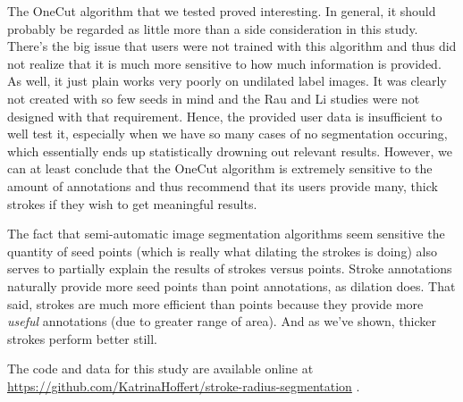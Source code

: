 \documentclass[12pt,a4paper,notitlepage]{article}
\begin{document}
The OneCut algorithm that we tested proved interesting. In general, it should probably be regarded as little more than a side consideration in this study. There's the big issue that users were not trained with this algorithm and thus did not realize that it is much more sensitive to how much information is provided. As well, it just plain works very poorly on undilated label images. It was clearly not created with so few seeds in mind and the Rau and Li studies were not designed with that requirement. Hence, the provided user data is insufficient to well test it, especially when we have so many cases of no segmentation occuring, which essentially ends up statistically drowning out relevant results. However, we can at least conclude that the OneCut algorithm is extremely sensitive to the amount of annotations and thus recommend that its users provide many, thick strokes if they wish to get meaningful results.

The fact that semi-automatic image segmentation algorithms seem sensitive the quantity of seed points (which is really what dilating the strokes is doing) also serves to partially explain the results of strokes versus points. Stroke annotations naturally provide more seed points than point annotations, as dilation does. That said, strokes are much more efficient than points because they provide more \textit{useful} annotations (due to greater range of area). And as we've shown, thicker strokes perform better still.

The code and data for this study are available online at \url{https://github.com/KatrinaHoffert/stroke-radius-segmentation} \cite{repo}.



\end{document}
